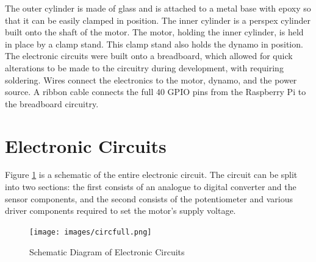 \documentclass[twoside,a4]{report}
\def\br{\newline \newline \noindent}
\begin{document}
	\br
	The outer cylinder is made of glass and is attached to a metal base with epoxy so that it can be easily clamped in position. The inner cylinder is a perspex cylinder built onto the shaft of the motor. The motor, holding the inner cylinder, is held in place by a clamp stand. This clamp stand also holds the dynamo in position.\br
	The electronic circuits were built onto a breadboard, which allowed for quick alterations to be made to the circuitry during development, with requiring soldering. Wires connect the electronics to the motor, dynamo, and the power source. A ribbon cable connects the full 40 GPIO pins from the Raspberry Pi to the breadboard circuitry.
	
	\section{Electronic Circuits} %
	Figure \ref{circfull} is a schematic of the entire electronic circuit. The circuit can be split into two sections: the first consists of an analogue to digital converter and the sensor components, and the second consists of the potentiometer and various driver components required to set the motor's supply voltage.
	\begin{figure}[!htb]
		\centering
		\texttt{[image: images/circfull.png]}
		\caption{Schematic Diagram of Electronic Circuits}
		\label{circfull}
	\end{figure}
\end{document}
